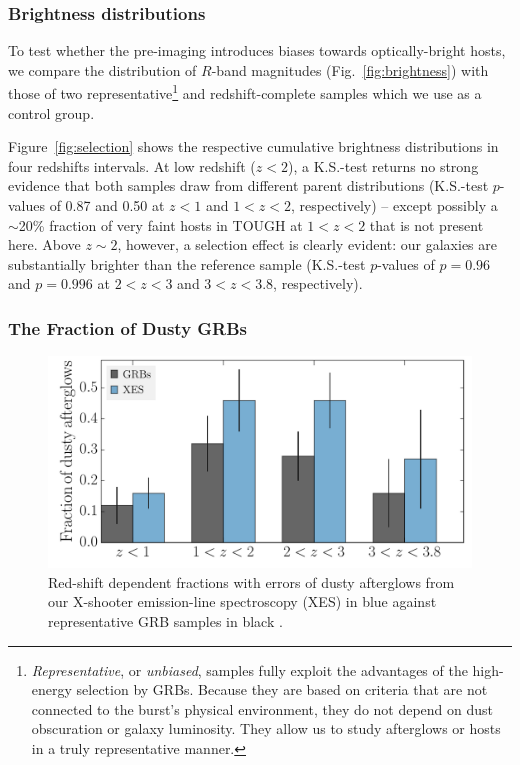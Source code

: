 \documentclass[traditabstract, longauth]{aa}
\begin{document}
\subsubsection{Brightness distributions}
\label{sec:bdist}

 {To test whether the pre-imaging introduces biases towards optically-bright hosts, we compare the distribution of $R$-band magnitudes (Fig.~\ref{fig:brightness}) with those of two representative\footnote{\textit{Representative}, or \textit{unbiased}, samples fully exploit the advantages of the high-energy selection by GRBs. Because they are based on criteria that are not connected to the burst's physical environment, they do not depend on dust obscuration or galaxy luminosity. They allow us to study afterglows or hosts in a truly representative manner.} and redshift-complete samples \citep{2012ApJ...756..187H, 2014arXiv1409.7064V} which we use as a control group.}
 
 {Figure~\ref{fig:selection} shows the respective cumulative brightness distributions in four redshifts intervals. At low redshift ($z<2$), a K.S.-test returns no strong evidence that both samples draw from different parent distributions (K.S.-test $p$-values of 0.87 and 0.50 at $z<1$ and $1<z<2$, respectively) -- except possibly a $\sim$20\% fraction of very faint hosts in TOUGH at $1<z<2$ that is not present here. Above $z \sim 2$, however, a selection effect is clearly evident: our galaxies are substantially brighter than the reference sample (K.S.-test $p$-values of $p=0.96$ and $p=0.996$ at $2<z<3$ and $3<z<3.8$, respectively).}

\subsubsection{The Fraction of Dusty GRBs}
\label{sec:dusty}

\begin{figure}
\includegraphics[angle=0, width=0.99\columnwidth]{Figs/DustyFrac.pdf}
\caption{Red-shift dependent fractions with errors of dusty afterglows from our X-shooter emission-line spectroscopy (XES) in blue against representative GRB samples in black \citep{2011A&A...526A..30G, 2013MNRAS.432.1231C}.}
\label{fig:dustyfrac}
\end{figure}
\end{document}

